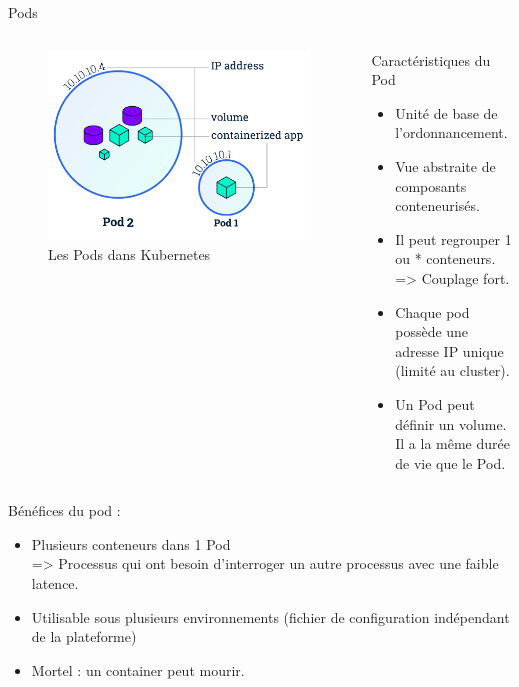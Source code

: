 \documentclass{bredelebeamer}
\begin{document}
\begin{frame}{Pods}

\begin{columns}
\begin{column}{0.5\textwidth}
\begin{figure}
\centering
\includegraphics[scale=0.25]{images/img7.png}
\caption{Les Pods dans Kubernetes}
\end{figure}
\end{column}
\begin{column}{0.5\textwidth}
\begin{block}{Caractéristiques du Pod}

\begin{itemize}
\item Unité de base de l'ordonnancement. 											\pause
\item Vue abstraite de composants conteneurisés.								\pause
\item Il peut regrouper 1 ou * conteneurs. \\=> Couplage fort.				\pause
\item Chaque pod possède une adresse IP unique (limité au cluster).		\pause
\item Un Pod peut définir un volume. 
		Il a la même durée de vie que le Pod.
\end{itemize}
\end{block}																							\pause
\end{column}



\end{columns}
\vspace{4px}
Bénéfices du pod : 
\begin{itemize}
\item Plusieurs conteneurs dans 1 Pod\\
=> Processus qui ont besoin d'interroger un autre processus avec une faible latence.		\pause
\item Utilisable sous plusieurs environnements (fichier de configuration indépendant de la plateforme)		\pause
\item Mortel : un container peut mourir.		
\end{itemize}
\end{frame}
\end{document}
